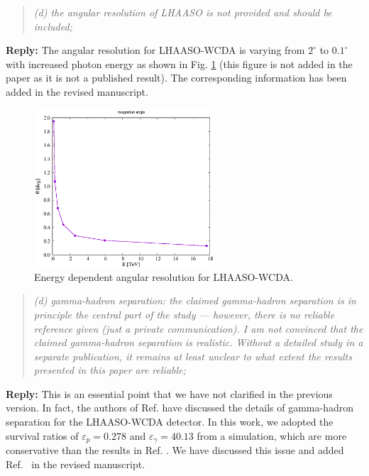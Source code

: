 \documentclass{article}
\begin{document}
\begin{quote}\emph{(d) the angular resolution of LHAASO is not provided and should be included;}\end{quote}

\textbf{Reply:} The angular resolution for LHAASO-WCDA is varying from $2^\circ$ to $0.1^\circ$ with increased photon energy as shown in Fig. \ref{fig:angular-resolution} (this figure is not added in the paper as it is not a published result). The corresponding information has been added in the revised manuscript.
\begin{figure}\centering
\includegraphics[width=0.60\textwidth]{theta.eps}
\caption{Energy dependent angular resolution for LHAASO-WCDA.}
\label{fig:angular-resolution}
\end{figure}

\begin{quote}\emph{(d) gamma-hadron separation: the claimed gamma-hadron separation is in principle the central part of the study --- however, there is no reliable reference given (just a private communication). I am not convinced that the claimed gamma-hadron separation is realistic. Without a detailed study in a separate publication, it remains at least unclear to what extent the results presented in this paper are reliable;}\end{quote}

\textbf{Reply:} This is an essential point that we have not clarified in the previous version. In fact, the authors of Ref. \cite{Zha:2017vcs} have discussed the details of gamma-hadron separation for the LHAASO-WCDA detector. In this work, we adopted the survival ratios of  $\varepsilon_{p}= 0.278$ and $\varepsilon_{\gamma}= 40.13$ from a simulation, which are more conservative than the results in Ref. \cite{Zha:2017vcs}. We have discussed this issue and added Ref.~\cite{Zha:2017vcs} in the revised manuscript.
\end{document}
